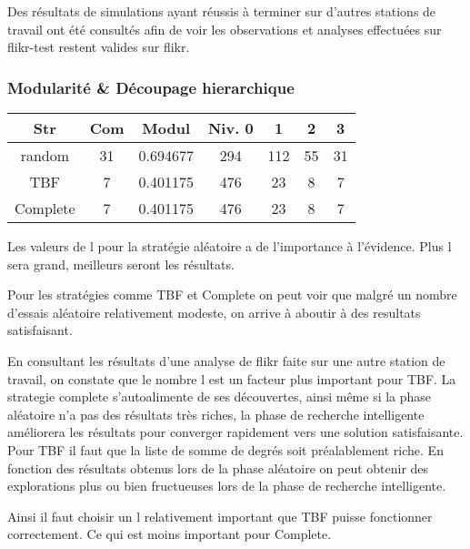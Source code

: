 Des résultats de simulations ayant réussis à terminer sur d'autres stations de travail ont
été consultés afin de voir les observations et analyses effectuées sur flikr-test restent
valides sur flikr.

\subsubsection{Modularité \& Découpage hierarchique}

\begin{center}
\begin{tabular}{|c|c|c|c|c|c|c|}
\hline
Str & Com & Modul& Niv. 0 & 1 & 2 & 3 \\ \hline
random & 31 & 0.694677 & 294 & 112 & 55 & 31 \\
TBF & 7 & 0.401175 & 476 & 23 & 8 & 7 \\
Complete & 7 & 0.401175 & 476 & 23 & 8 & 7 \\
\hline
\end{tabular}
\end{center}


Les valeurs de l pour la stratégie aléatoire a de l'importance à l'évidence.
Plus l sera grand, meilleurs seront les résultats.

Pour les stratégies comme TBF et Complete on peut voir que malgré un nombre
d'essais aléatoire relativement modeste, on arrive à aboutir à des resultats satisfaisant.

En consultant les résultats d'une analyse de flikr faite sur une autre station de travail,
 on constate que le nombre l
 est un facteur plus important pour TBF. La strategie complete s'autoalimente de ses
découvertes, ainsi même si la phase aléatoire n'a pas des résultats très riches,
la phase de recherche intelligente améliorera les résultats pour converger rapidement
vers une solution satisfaisante. Pour TBF il faut que la liste
 de somme de degrés soit préalablement riche. En fonction des résultats obtenus lors de la phase aléatoire
on peut obtenir des explorations plus ou bien fructueuses lors de la phase de recherche intelligente.

Ainsi il faut choisir un l relativement important que TBF puisse fonctionner correctement. Ce qui est
moins important pour Complete.
